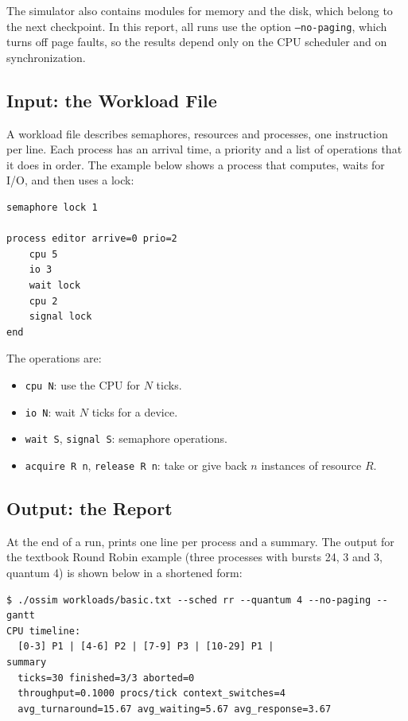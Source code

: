 The simulator also contains modules for memory and the disk, which belong to the next checkpoint. In this report, all runs use the option \texttt{--no-paging}, which turns off page faults, so the results depend only on the CPU scheduler and on synchronization.

\subsection{Input: the Workload File}
A workload file describes semaphores, resources and processes, one instruction per line. Each process has an arrival time, a priority and a list of operations that it does in order. The example below shows a process that computes, waits for I/O, and then uses a lock:

\begin{lstlisting}
semaphore lock 1

process editor arrive=0 prio=2
    cpu 5
    io 3
    wait lock
    cpu 2
    signal lock
end
\end{lstlisting}

The operations are:
\begin{itemize}
    \item \texttt{cpu N}: use the CPU for $N$ ticks.
    \item \texttt{io N}: wait $N$ ticks for a device.
    \item \texttt{wait S}, \texttt{signal S}: semaphore operations.
    \item \texttt{acquire R n}, \texttt{release R n}: take or give back $n$ instances of resource $R$.
\end{itemize}

\subsection{Output: the Report}
At the end of a run, \ossim{} prints one line per process and a summary. The output for the textbook Round Robin example (three processes with bursts 24, 3 and 3, quantum 4) is shown below in a shortened form:

\begin{lstlisting}
$ ./ossim workloads/basic.txt --sched rr --quantum 4 --no-paging --gantt
CPU timeline:
  [0-3] P1 | [4-6] P2 | [7-9] P3 | [10-29] P1 |
summary
  ticks=30 finished=3/3 aborted=0
  throughput=0.1000 procs/tick context_switches=4
  avg_turnaround=15.67 avg_waiting=5.67 avg_response=3.67
\end{lstlisting}

